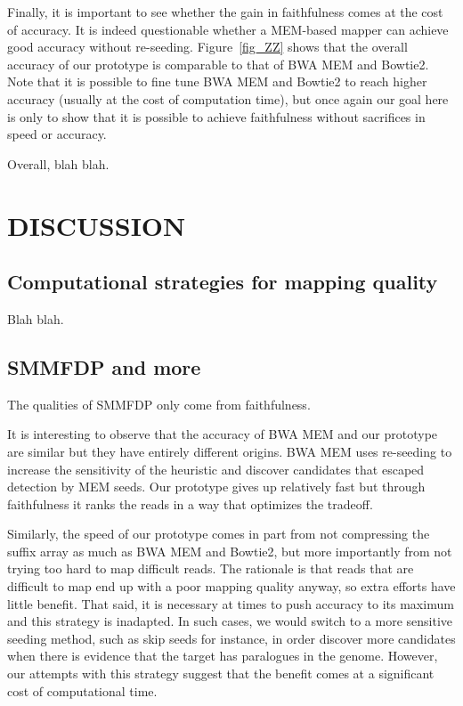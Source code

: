 \documentclass[a4,center,fleqn]{NAR}
\begin{document}
Finally, it is important to see whether the gain in faithfulness comes at
the cost of accuracy. It is indeed questionable whether a MEM-based mapper
can achieve good accuracy without re-seeding. Figure~\ref{fig_ZZ} shows
that the overall accuracy of our prototype is comparable to that of BWA
MEM and Bowtie2. Note that it is possible to fine tune BWA MEM and Bowtie2
to reach higher accuracy (usually at the cost of computation time), but
once again our goal here is only to show that it is possible to achieve
faithfulness without sacrifices in speed or accuracy.

Overall, blah blah.


\section{DISCUSSION}

\subsection{Computational strategies for mapping quality}

Blah blah.

\subsection{SMMFDP and more}

The qualities of SMMFDP only come from faithfulness.

It is interesting to observe that the accuracy of BWA MEM and our
prototype are similar but they have entirely different origins. BWA MEM
uses re-seeding to increase the sensitivity of the heuristic and discover
candidates that escaped detection by MEM seeds. Our prototype gives up
relatively fast but through faithfulness it ranks the reads in a way that
optimizes the tradeoff.

Similarly, the speed of our prototype comes in part from not compressing
the suffix array as much as BWA MEM and Bowtie2, but more importantly from
not trying too hard to map difficult reads. The rationale is that reads
that are difficult to map end up with a poor mapping quality anyway, so
extra efforts have little benefit. That said, it is necessary at times to
push accuracy to its maximum and this strategy is inadapted. In such
cases, we would switch to a more sensitive seeding method, such as skip
seeds for instance, in order discover more candidates when there is
evidence that the target has paralogues in the genome. However, our
attempts with this strategy suggest that the benefit comes at a
significant cost of computational time.
\end{document}
